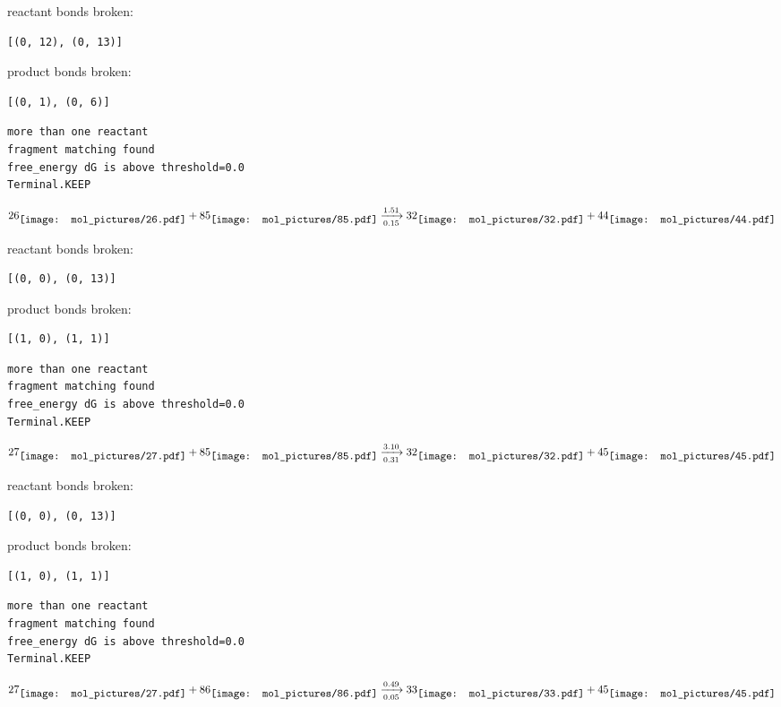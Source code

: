 \documentclass{article}
\begin{document}
reactant bonds broken:\begin{verbatim}
[(0, 12), (0, 13)]
\end{verbatim}
product bonds broken:\begin{verbatim}
[(0, 1), (0, 6)]
\end{verbatim}




\vspace{1cm}
\begin{verbatim}
more than one reactant
fragment matching found
free_energy dG is above threshold=0.0
Terminal.KEEP
\end{verbatim}
$$
26
\raisebox{-.5\height}{\texttt{[image: mol\_pictures/26.pdf]}}
+
85
\raisebox{-.5\height}{\texttt{[image: mol\_pictures/85.pdf]}}
\xrightarrow[0.15]{1.51}
32
\raisebox{-.5\height}{\texttt{[image: mol\_pictures/32.pdf]}}
+
44
\raisebox{-.5\height}{\texttt{[image: mol\_pictures/44.pdf]}}
$$


reactant bonds broken:\begin{verbatim}
[(0, 0), (0, 13)]
\end{verbatim}
product bonds broken:\begin{verbatim}
[(1, 0), (1, 1)]
\end{verbatim}




\vspace{1cm}
\begin{verbatim}
more than one reactant
fragment matching found
free_energy dG is above threshold=0.0
Terminal.KEEP
\end{verbatim}
$$
27
\raisebox{-.5\height}{\texttt{[image: mol\_pictures/27.pdf]}}
+
85
\raisebox{-.5\height}{\texttt{[image: mol\_pictures/85.pdf]}}
\xrightarrow[0.31]{3.10}
32
\raisebox{-.5\height}{\texttt{[image: mol\_pictures/32.pdf]}}
+
45
\raisebox{-.5\height}{\texttt{[image: mol\_pictures/45.pdf]}}
$$


reactant bonds broken:\begin{verbatim}
[(0, 0), (0, 13)]
\end{verbatim}
product bonds broken:\begin{verbatim}
[(1, 0), (1, 1)]
\end{verbatim}




\vspace{1cm}
\begin{verbatim}
more than one reactant
fragment matching found
free_energy dG is above threshold=0.0
Terminal.KEEP
\end{verbatim}
$$
27
\raisebox{-.5\height}{\texttt{[image: mol\_pictures/27.pdf]}}
+
86
\raisebox{-.5\height}{\texttt{[image: mol\_pictures/86.pdf]}}
\xrightarrow[0.05]{0.49}
33
\raisebox{-.5\height}{\texttt{[image: mol\_pictures/33.pdf]}}
+
45
\raisebox{-.5\height}{\texttt{[image: mol\_pictures/45.pdf]}}
$$
\end{document}
